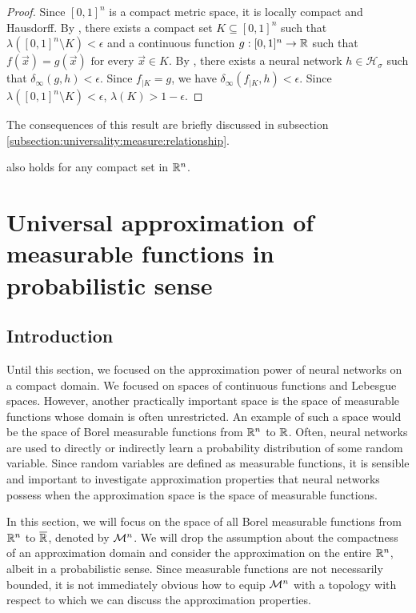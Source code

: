 \begin{proof}
Since $[0,1]^n$ is a compact metric space, it is locally compact and Hausdorff. 
By , there exists a compact set $K \subseteq [0,1]^n$ such that $\lambda([0,1]^n \setminus K) < \epsilon$ and a continuous function $g : [0,1]^n \to {\mathbb R}$ such that $f(\vec{x}) = g(\vec{x}) \text{ for every $\vec{x}$} \in K.$ By , there exists a neural network $h \in \mathcal{H}_{\sigma}$ such that
$\delta_{\infty}(g, h) < \epsilon$. Since $f_{| K} = g$, we have $\delta_{\infty}(f_{| K}, h) < \epsilon$. Since $\lambda([0,1]^n \setminus K) < \epsilon$, $\lambda(K) > 1 - \epsilon$.
\end{proof}

\begin{remark}
The consequences of this result are briefly discussed in subsection \ref{subsection:universality:measure:relationship}.
\end{remark}
\begin{remark}
 also holds for any compact set in ${\mathbb R}^n$.
\end{remark}

\section{Universal approximation of measurable functions in probabilistic sense}
\label{section:universality:measurable:probabilistic}

\subsection{Introduction}
Until this section, we focused on the approximation power of neural networks on a compact domain. We focused on spaces of continuous functions and Lebesgue spaces. However, another practically important space is the space of measurable functions whose domain is often unrestricted. An example of such a space would be the space of Borel measurable functions from ${\mathbb R}^n$ to ${\mathbb R}$. Often, neural networks are used to directly or indirectly learn a probability distribution of some random variable. Since random variables are defined as measurable functions, it is sensible and important to investigate approximation properties that neural networks possess when the approximation space is the space of measurable functions. 

In this section, we will focus on the space of all Borel measurable functions from ${\mathbb R}^n$ to $\overline{{\mathbb R}}$, denoted by ${\mathcal M}^n$.
We will drop the assumption about the compactness of an approximation domain and consider the approximation on the entire ${\mathbb R}^n$, albeit in a probabilistic sense. Since measurable functions are not necessarily bounded, it is not immediately obvious how to equip ${\mathcal M}^n$ with a topology with respect to which we can discuss the approximation properties. 

